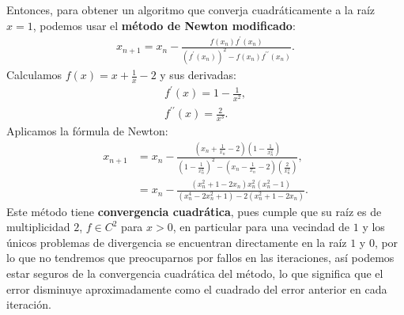 \begin{homeworkProblem}
\begin{enumerate}
\begin{solucion}
        Entonces, para obtener un algoritmo que converja cuadráticamente a la raíz $x = 1$, podemos usar el \textbf{método de Newton modificado}:
        \begin{align*}
          x_{n+1} = x_n - \frac{f(x_n)f^{\prime}(x_n)}{(f^{\prime}(x_n))^2-f(x_n)f^{\prime\prime}(x_n)}.
        \end{align*}
        Calculamos $f(x) = x + \frac{1}{x} - 2$ y sus derivadas:
        \begin{align*}
          f^{\prime}(x) = 1 - \frac{1}{x^2},\\
          f^{\prime\prime}(x) = \frac{2}{x^{3}}.
        \end{align*}
        Aplicamos la fórmula de Newton:
        \begin{align*}
          x_{n+1} &= x_n - \frac{\left(x_n + \frac{1}{x_n} - 2\right)\left( 1-\frac{1}{x_n^2} \right)}{\left(1 - \frac{1}{x_n^2}\right)^2-\left( x_n-\frac{1}{x_n}-2 \right)\left( \frac{2}{x_n^3} \right)},\\
          &=x_n - \frac{(x_n^2 + 1 - 2x_n) x_n^2 (x_n^2 - 1)}{(x_n^4 - 2x_n^2 + 1) - 2(x_n^2 + 1 - 2x_n)}.
        \end{align*}
        Este método tiene \textbf{convergencia cuadrática}, pues cumple que su raíz es de multiplicidad $2$, $f\in C^2$ para $x>0$, en particular para una vecindad de $1$ y los únicos problemas de divergencia se encuentran directamente en la raíz $1$ y $0$, por lo que no tendremos que preocuparnos por fallos en las iteraciones, así podemos estar seguros de la convergencia cuadrática del método, lo que significa que el error disminuye aproximadamente como el cuadrado del error anterior en cada iteración. 
      \end{solucion}
  \end{enumerate}
\end{homeworkProblem}
